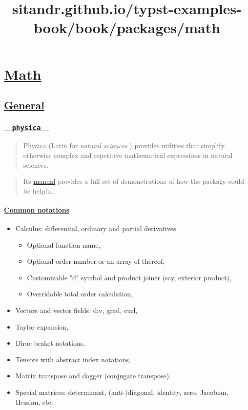 \title{sitandr.github.io/typst-examples-book/book/packages/math}

\section{\texorpdfstring{\hyperref[math]{Math}}{Math}}\label{math}

\subsection{\texorpdfstring{\hyperref[general]{General}}{General}}\label{general}

\subsubsection{\texorpdfstring{\hyperref[physica]{\texttt{\ }{\texttt{\ physica\ }}\texttt{\ }}}{  physica  }}\label{physica}

\begin{quote}
Physica (Latin for \emph{natural sciences} ) provides utilities that
simplify otherwise complex and repetitive mathematical expressions in
natural sciences.
\end{quote}

\begin{quote}
Its
\href{https://github.com/Leedehai/typst-physics/blob/master/physica-manual.pdf}{manual}
provides a full set of demonstrations of how the package could be
helpful.
\end{quote}

\paragraph{\texorpdfstring{\hyperref[common-notations]{Common
notations}}{Common notations}}\label{common-notations}

\begin{itemize}
\tightlist
\item
  Calculus: differential, ordinary and partial derivatives

  \begin{itemize}
  \tightlist
  \item
    Optional function name,
  \item
    Optional order number or an array of thereof,
  \item
    Customizable "d" symbol and product joiner (say, exterior product),
  \item
    Overridable total order calculation,
  \end{itemize}
\item
  Vectors and vector fields: div, grad, curl,
\item
  Taylor expansion,
\item
  Dirac braket notations,
\item
  Tensors with abstract index notations,
\item
  Matrix transpose and dagger (conjugate transpose).
\item
  Special matrices: determinant, (anti-)diagonal, identity, zero,
  Jacobian, Hessian, etc.
\end{itemize}

